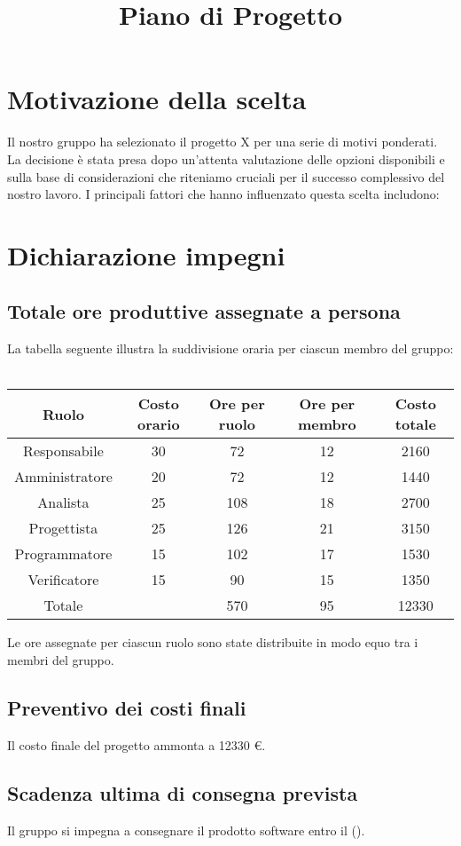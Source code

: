\documentclass[12pt]{article}
\title{Piano di Progetto}
\date{}
\begin{document}
\maketitle

\section{Motivazione della scelta}
Il nostro gruppo ha selezionato il progetto X per una serie di motivi ponderati. La decisione è stata presa dopo un'attenta valutazione delle opzioni disponibili e sulla base di considerazioni che riteniamo cruciali per il successo complessivo del nostro lavoro. I principali fattori che hanno influenzato questa scelta includono:

\section{Dichiarazione impegni}

\subsection{Totale ore produttive assegnate a persona}
La tabella seguente illustra la suddivisione oraria per ciascun membro del gruppo:\\ \\
\begin{tabular}{|c|c|c|c|c|}
\hline
Ruolo & Costo orario & Ore per ruolo & Ore per membro & Costo totale \\
\hline
\hline
Responsabile & 30 & 72 & 12 & 2160 \\
Amministratore & 20 & 72 & 12 & 1440 \\
Analista & 25 & 108 & 18 & 2700 \\
Progettista & 25 & 126 & 21 & 3150 \\
Programmatore & 15 & 102 & 17 & 1530 \\
Verificatore & 15 & 90 & 15 & 1350 \\
\hline
\hline
Totale &  & 570 & 95 & 12330 \\
\hline
\end{tabular}
Le ore assegnate per ciascun ruolo sono state distribuite in modo equo tra i membri del gruppo.

\subsection{Preventivo dei costi finali}
Il costo finale del progetto ammonta a 12330 €.

\subsection{Scadenza ultima di consegna prevista}
Il gruppo si impegna a consegnare il prodotto software entro il ().
\end{document}
